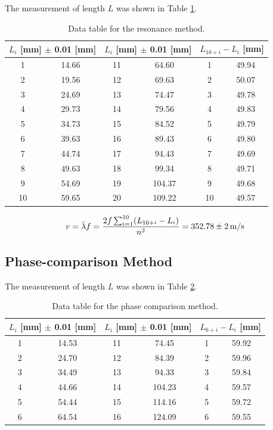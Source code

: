 \documentclass{article}
\begin{document}
The measurement of length $L$ was shown in Table \ref{tab-1}.

\begin{table}[!h]
\begin{center}
\begin{tabular}{|c|c||c|c||c|c|}
\hline
\multicolumn{2}{|c||}{$L_i$ [mm] $\pm$ 0.01 [mm]} &
\multicolumn{2}{|c||}{$L_i$ [mm] $\pm$ 0.01 [mm]} &
\multicolumn{2}{|c|}{$L_{10+i}-L_i$ [mm]} \\
\hline
1 & 14.66 & 11 & 64.60 & 1 & 49.94 \\
2 & 19.56 & 12 & 69.63 & 2 & 50.07 \\
3 & 24.69 & 13 & 74.47 & 3 & 49.78 \\
4 & 29.73 & 14 & 79.56 & 4 & 49.83 \\
5 & 34.73 & 15 & 84.52 & 5 & 49.79 \\
6 & 39.63 & 16 & 89.43 & 6 & 49.80 \\
7 & 44.74 & 17 & 94.43 & 7 & 49.69 \\
8 & 49.63 & 18 & 99.34 & 8 & 49.71 \\
9 & 54.69 & 19 & 104.37& 9 & 49.68 \\
10& 59.65 & 20 & 109.22& 10& 49.57 \\
\hline
\end{tabular}
\caption{Data table for the resonance method.}
\label{tab-1}
\end{center}
\end{table}

$$v=\bar{\lambda}f=\frac{2f\sum_{i=1}^{10}(L_{10+i}-L_i)}{n^2}=352.78\pm 2\,\rm{m/s}$$

\subsection{Phase-comparison Method}

The measurement of length $L$ was shown in Table \ref{tab-2}.

\begin{table}[!h]
\begin{center}
\begin{tabular}{|c|c||c|c||c|c|}
\hline
\multicolumn{2}{|c||}{$L_i$ [mm] $\pm$ 0.01 [mm]} &
\multicolumn{2}{|c||}{$L_i$ [mm] $\pm$ 0.01 [mm]} &
\multicolumn{2}{|c|}{$L_{6+i}-L_i$ [mm]} \\
\hline
1 & 14.53 & 11 & 74.45 & 1 & 59.92 \\
2 & 24.70 & 12 & 84.39 & 2 & 59.96 \\
3 & 34.49 & 13 & 94.33 & 3 & 59.84 \\
4 & 44.66 & 14 & 104.23& 4 & 59.57 \\
5 & 54.44 & 15 & 114.16& 5 & 59.72 \\
6 & 64.54 & 16 & 124.09& 6 & 59.55 \\
\hline
\end{tabular}
\caption{Data table for the phase comparison method.}
\label{tab-2}
\end{center}
\end{table}
\end{document}
